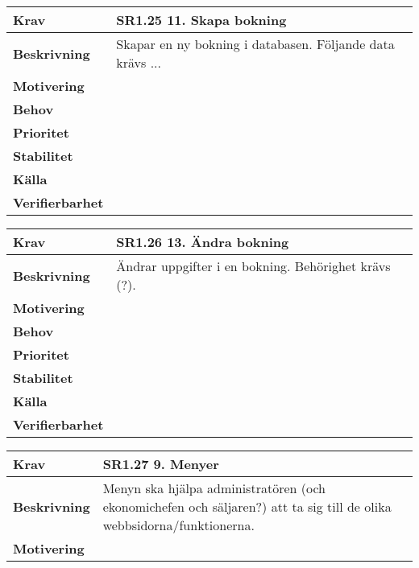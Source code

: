 \documentclass[a4paper, twoside, 11pt, titlepage]{article}
\begin{document}
	\begin{tabular} { p{2.6cm} p{12.5cm} }
		\hline
		\sffamily\textbf{Krav} & \sffamily\textbf{SR1.25 11. Skapa bokning } \\
		\hline
		\sffamily\textbf{Beskrivning} & Skapar en ny bokning i databasen. Följande data krävs ...  \\
		\hline
		\sffamily\textbf{Motivering} &   \\
		\hline
		\sffamily\textbf{Behov} &   \\
		\hline
		\sffamily\textbf{Prioritet} &   \\
		\hline
		\sffamily\textbf{Stabilitet} &   \\
		\hline
		\sffamily\textbf{Källa} &   \\
		\hline
		\sffamily\textbf{Verifierbarhet} &   \\
		\hline
	\end{tabular}
	\vspace{6mm}

	\begin{tabular} { p{2.6cm} p{12.5cm} }
		\hline
		\sffamily\textbf{Krav} & \sffamily\textbf{SR1.26 13. Ändra bokning } \\
		\hline
		\sffamily\textbf{Beskrivning} & Ändrar uppgifter i en bokning. Behörighet krävs (?).  \\
		\hline
		\sffamily\textbf{Motivering} &   \\
		\hline
		\sffamily\textbf{Behov} &   \\
		\hline
		\sffamily\textbf{Prioritet} &   \\
		\hline
		\sffamily\textbf{Stabilitet} &   \\
		\hline
		\sffamily\textbf{Källa} &   \\
		\hline
		\sffamily\textbf{Verifierbarhet} &   \\
		\hline
	\end{tabular}
	\vspace{6mm}

	\begin{tabular} { p{2.6cm} p{12.5cm} }
		\hline
		\sffamily\textbf{Krav} & \sffamily\textbf{SR1.27 9. Menyer } \\
		\hline
		\sffamily\textbf{Beskrivning} & Menyn ska hjälpa administratören (och ekonomichefen och säljaren?) att ta sig till de olika webbsidorna/funktionerna.  \\
		\hline
		\sffamily\textbf{Motivering} &   \\
		\hline
	\end{tabular}
	\vspace{6mm}
\end{document}
